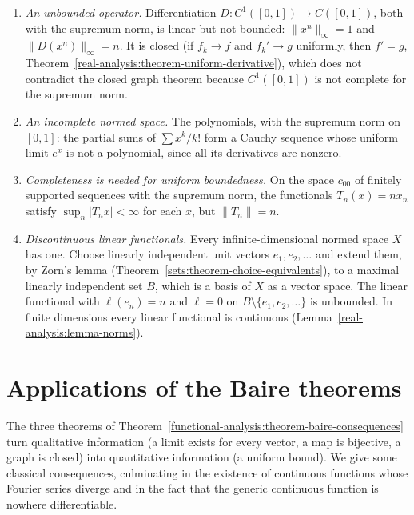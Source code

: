 \begin{counterexample}\label{functional-analysis:counterexample-unbounded}
\begin{enumerate}
\item \emph{An unbounded operator.} Differentiation $D \colon C^1([0, 1]) \to C([0, 1])$, both with the supremum norm, is linear but not bounded: $\|x^n\|_\infty = 1$ and $\|D(x^n)\|_\infty = n$. It is closed (if $f_k \to f$ and $f_k' \to g$
uniformly, then $f' = g$, Theorem~\ref{real-analysis:theorem-uniform-derivative}), which does not contradict the closed graph theorem because $C^1([0, 1])$ is not complete for the supremum norm.
\item \emph{An incomplete normed space.} The polynomials, with the supremum norm on $[0, 1]$: the partial sums of $\sum x^k/k!$ form a Cauchy sequence whose uniform limit $e^x$ is not a polynomial, since all its derivatives are nonzero.
\item \emph{Completeness is needed for uniform boundedness.} On the space $c_{00}$ of finitely supported sequences with the supremum norm, the functionals $T_n(x) = nx_n$ satisfy $\sup_n|T_nx| < \infty$ for each $x$, but $\|T_n\| = n$.
\item \emph{Discontinuous linear functionals.} Every infinite-dimensional normed space $X$ has one. Choose linearly independent unit vectors $e_1, e_2, \ldots$ and extend them, by Zorn's lemma
(Theorem~\ref{sets:theorem-choice-equivalents}), to a maximal linearly independent set $B$, which is a basis of $X$ as a vector space. The linear functional with $\ell(e_n) = n$ and $\ell = 0$ on $B \setminus \{e_1, e_2, \ldots\}$ is unbounded.
In finite dimensions every linear functional is continuous (Lemma~\ref{real-analysis:lemma-norms}).
\end{enumerate}
\end{counterexample}

\section{Applications of the Baire theorems}\label{functional-analysis:section-baire-applications}

The three theorems of Theorem~\ref{functional-analysis:theorem-baire-consequences} turn qualitative information (a limit exists for every vector, a map is bijective, a graph is closed) into
quantitative information (a uniform bound). We give some classical consequences, culminating in the existence of continuous functions whose Fourier series diverge and in the fact that the generic continuous function is nowhere
differentiable.

